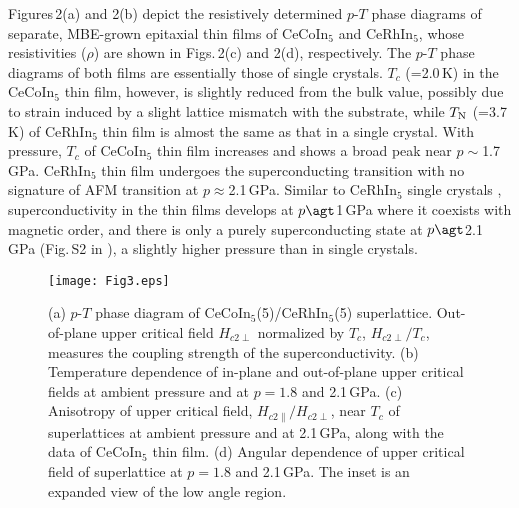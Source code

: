 \documentclass[twocolumn,preprintnumbers,amsmath,amssymb,prl]{revtex4}
\begin{document}
Figures\,2(a) and 2(b) depict the  resistively determined  $p$-$T$ phase diagrams of  separate, MBE-grown epitaxial thin films of  CeCoIn$_5$ and CeRhIn$_5$, whose resistivities  ($\rho$) are  shown in Figs.\,2(c) and 2(d), respectively.  The $p$-$T$ phase diagrams of both films are essentially those of single crystals.  
$T_c$ (=2.0\,K) in the CeCoIn$_5$ thin film, however, is slightly reduced from the bulk value, possibly due to strain  induced by a slight lattice mismatch with  the substrate, while $T_{\rm N}$ (=3.7\,K) of CeRhIn$_5$ thin film is almost the same as that in a single crystal.  With pressure, $T_c$ of CeCoIn$_5$ thin film increases and shows a broad peak  near $p\sim$1.7\,GPa.  CeRhIn$_5$ thin film undergoes the superconducting transition with no signature of AFM transition at $p\approx$2.1\,GPa.  Similar to CeRhIn$_5$  single crystals \cite{Park2006,Sidorov,Park2008},  superconductivity  in the thin films develops  at $p\agt$1\,GPa  where it coexists with magnetic order, and  there is only a  purely superconducting state  at $p\agt$2.1\,GPa (Fig.\,S2 in \cite{SM}), a slightly higher pressure than in single crystals.  


\begin{figure}[t]
 	\begin{center}
 		\texttt{[image: Fig3.eps]}
 		\caption{
		(a) $p$-$T$ phase diagram of CeCoIn$_5$(5)/CeRhIn$_5$(5) superlattice.  %
		Out-of-plane upper critical field $H_{c2\perp}$ normalized by $T_c$, $H_{c2\perp}/T_c$, measures the coupling strength of the  superconductivity. 
		(b) Temperature dependence of in-plane and out-of-plane upper critical fields at ambient pressure and at $p=1.8$ and 2.1\,GPa. (c) Anisotropy of upper critical field, $H_{c2\parallel}/H_{c2\perp}$, near $T_c$ of superlattices at ambient pressure and at 2.1\,GPa, along with the data of CeCoIn$_5$ thin film. (d) Angular dependence of upper critical field of superlattice at $p=1.8$ and 2.1\,GPa. The inset is an expanded view of the low angle region.
 		}
 		\label{fig:Fig1.eps}
 	\end{center}
 \end{figure}
 
\end{document}
